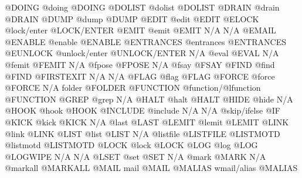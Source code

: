 \documentclass[letterpaper,10pt,english]{sphinxmanual}
\begin{document}
\begin{sphinxVerbatim}[commandchars=\\\{\}]
@DOING                  @doing                         @DOING
@DOLIST                 @dolist                        @DOLIST
@DRAIN                  @drain                         @DRAIN
@DUMP                   @dump                          @DUMP
@EDIT                   @edit                          @EDIT
@ELOCK                  @lock/enter                    @LOCK/ENTER
@EMIT                   @emit                          @EMIT
N/A                     N/A                            @EMAIL
@ENABLE                 @enable                        @ENABLE
@ENTRANCES              @entrances                     @ENTRANCES
@EUNLOCK                @unlock/enter                  @UNLOCK/ENTER
N/A                     @eval                          @EVAL
N/A                     @femit                         @FEMIT
N/A                     @fpose                         @FPOSE
N/A                     @fsay                          @FSAY
@FIND                   @find                          @FIND
@FIRSTEXIT              N/A                            N/A
@FLAG                   @flag                          @FLAG
@FORCE                  @force                         @FORCE
N/A                     folder                         @FOLDER
@FUNCTION               @function/@lfunction           @FUNCTION
@GREP                   @grep                          N/A
@HALT                   @halt                          @HALT
@HIDE                   @hide                          N/A
@HOOK                   @hook                          @HOOK
@INCLUDE                @include                       N/A
N/A                     @skip/ifelse                   @IF
@KICK                   @kick                          @KICK
N/A                     @last                          @LAST
@LEMIT                  @lemit                         @LEMIT
@LINK                   @link                          @LINK
@LIST                   @list                          @LIST
N/A                     @list\PYGZus{}file                     @LIST\PYGZus{}FILE
@LISTMOTD               @listmotd                      @LISTMOTD
@LOCK                   @lock                          @LOCK
@LOG                    @log                           @LOG
@LOGWIPE                N/A                            N/A
@LSET                   @set                           @SET
N/A                     @mark                          @MARK
N/A                     @mark\PYGZus{}all                      @MARK\PYGZus{}ALL
@MAIL                   mail                           @MAIL
@MALIAS                 wmail/alias                    @MALIAS

\end{sphinxVerbatim}
\end{document}
